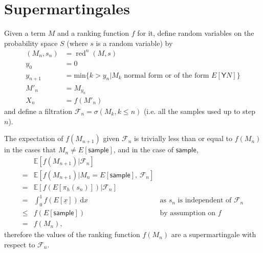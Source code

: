 \documentclass{article}
\newcommand{\Y}{\textsf{Y}}
\newcommand{\sample}{\textsf{sample}}
\DeclareMathOperator{\red}{red}
\begin{document}
\begin{comment} I'm not sure whether this section will be needed any more.
\section{Recursive steps}
Define a reduction relation on PPCF terms that excludes the $\Y$ combinator (``nonrecursive reduction''), i.e. $E[M] \dashrightarrow E[N] \text{ if } M \to N$ for any redex $M$ not of the form $\Y M'$.

This reduction relation is strongly normalizing because of the simple type system, so for any term $M$ there is some bound $b$ such that nonrecursive reduction of $M$ must terminate in at most $b$ steps. Define $\red_{nr} : \Lambda \times S \to \Lambda \times S$ like $\red(M,s)$, but using nonrecursive reduction instead of reduction, and let $\red_Y(M,s) = \red^{b_M}_{nr}(M,s)$. The sequence $(r_\Lambda(M,s,n), r_S(M,s,n)) = r(M,s,n) = \left(\red_Y \circ \red \right)^n(\red_Y(M,s))$ is then a subsequence of $\left( \red^n(M,s) \right)_n$ consisting of only terms which are either normal form or of the form $E[\Y N]$ for some $N$.
\end{comment}

\section{Supermartingales}
Given a term $M$ and a ranking function $f$ for it, define random variables on the probability space $S$ (where $s$ is a random variable) by
\begin{align*}
(M_n,s_n) & = \red^n(M,s) \\
y_0 & = 0 \\
y_{n+1} & = \text{min} \{ k>y_n | M_k \text{ normal form or of the form } E[\Y N] \} \\
M'_n & = M_{y_n} \\
X_n & = f(M'_n)
\end{align*}
and define a filtration $\mathcal{F}_n = \sigma(M_k, k \leq n)$ (i.e. all the samples used up to step $n$).

The expectation of $f(M_{n+1})$ given $\mathcal{F}_n$ is trivially less than or equal to $f(M_n)$ in the cases that $M_n \neq E[\sample]$, and in the case of $\sample$,
\begin{align*}
& \mathbb{E}[f(M_{n+1}) | \mathcal{F}_n] \\
= & \mathbb{E}[f(M_{n+1}) | M_n = E[\sample],\, \mathcal{F}_n] \\
= & \mathbb{E}[f(E[\pi_h(s_n)]) | \mathcal{F}_n] \\
= & \int_0^1 f(E[\underline x]) \, \mathrm{d} x \qquad & \text{as }s_n\text{ is independent of } \mathcal{F}_n \\
\leq & f(E[\sample]) \qquad & \text{by assumption on } f \\
= & f(M_n),
\end{align*}
therefore the values of the ranking function $f(M_n)$ are a supermartingale with respect to $\mathcal{F}_n$.
\end{document}
